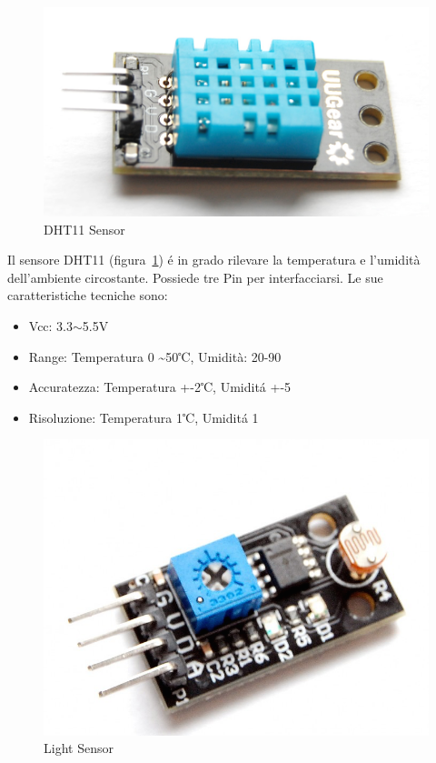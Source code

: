 \newpage

\begin{figure}
\centering
\includegraphics[width=0.7\linewidth]{Figures/Sensors&Rasp/dht11}
\caption[dht11]{DHT11 Sensor}
\label{fig:dht11}
\end{figure}

 Il sensore DHT11 (figura~\ref{fig:dht11}) \'e in grado rilevare la temperatura e l'umidità dell'ambiente circostante. Possiede tre Pin per interfacciarsi.
 Le sue caratteristiche tecniche sono:
 
 \begin{itemize}
 	\item Vcc: 3.3$\sim$5.5V
 	\item Range: Temperatura 0 \textasciitilde 50℃, Umidità:  20-90%
 	\item Accuratezza: Temperatura +-2℃, Umidit\'a +-5%
 	\item Risoluzione: Temperatura  1℃, Umidit\'a  1%
 \end{itemize}
 
 \newpage
 
\begin{figure}
	\centering
	\includegraphics[width=0.7\linewidth]{Figures/Sensors&Rasp/light}
	\caption[light]{Light Sensor}
	\label{fig:light}
\end{figure}


